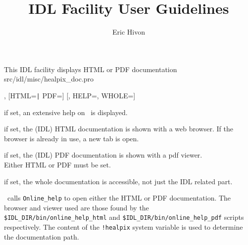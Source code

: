 


\sloppy



\title{\healpix IDL Facility User Guidelines}
 \section[healpix\_doc: PDF and HTML documentation]{ }
\label{idl:healpix_doc}
\author{Eric Hivon}




\begin{facility}
{This IDL facility displays HTML or PDF \healpix documentation}
{src/idl/misc/healpix\_doc.pro}
\end{facility}

\begin{IDLformat}
{\thedocid , [HTML={\tt |} PDF=] [, HELP=,  WHOLE=] }
\end{IDLformat}

\begin{keywords}
  \begin{kwlist}{} %
    \item[HELP=] if set, an extensive help on \thedocid\ is displayed.
    \item[HTML=]  if set, the \healpix (IDL) HTML documentation is shown with a web browser.
            If the browser is already in use, a new tab is open.
    \item[PDF=]   if set, the \healpix (IDL) PDF documentation is shown with a pdf viewer.\\
            Either HTML or PDF must be set.
    \item[WHOLE=]  if set, the whole \healpix documentation is accessible,
              not just the IDL related part.
  \end{kwlist}
\end{keywords}  

\begin{codedescription}
{\thedocid\  calls {\tt Online\_help} to open either the HTML or PDF \healpix
documentation. The browser and viewer used are those found by the 
{\tt \$IDL\_DIR/bin/online\_help\_html} and 
{\tt \$IDL\_DIR/bin/online\_help\_pdf} scripts respectively.
The content of the {\tt !healpix} system variable is used to
determine the documentation path.}
\end{codedescription}



